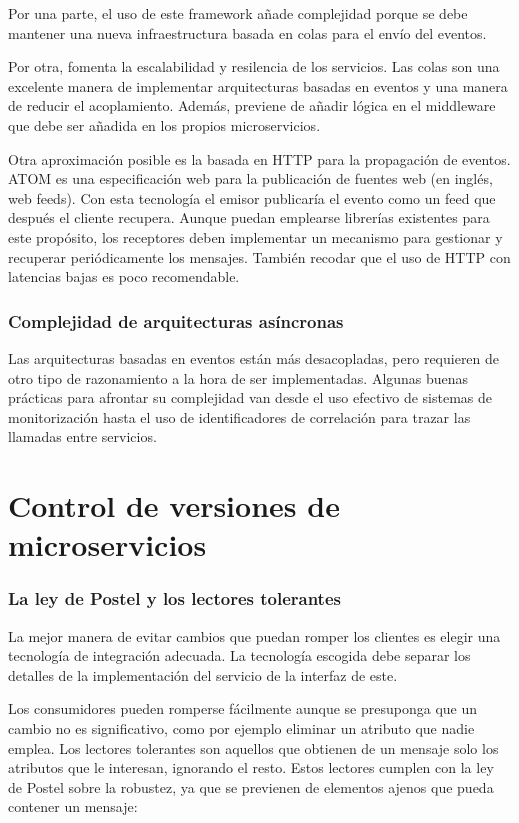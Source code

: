 \documentclass[11pt,a4paper]{article}
\begin{document}
Por una parte, el uso de este framework añade complejidad porque se debe mantener una nueva infraestructura basada en colas para el envío del eventos. 

Por otra, fomenta la escalabilidad y resilencia de los servicios. Las colas son una excelente manera de implementar arquitecturas basadas en eventos y una manera de reducir el acoplamiento. Además, previene de añadir lógica en el middleware que debe ser añadida en los propios microservicios.

Otra aproximación posible es la basada en HTTP para la propagación de eventos. ATOM es una especificación web para la publicación de fuentes web (en inglés, web feeds). Con esta tecnología el emisor publicaría el evento como un feed que después el cliente recupera. Aunque puedan emplearse librerías existentes para este propósito, los receptores deben implementar un mecanismo para gestionar y recuperar periódicamente los mensajes. También recodar que el uso de HTTP con latencias bajas es poco recomendable. 

\section{Complejidad de arquitecturas asíncronas}

Las arquitecturas basadas en eventos están más desacopladas, pero requieren de otro tipo de razonamiento a la hora de ser implementadas. Algunas buenas prácticas para afrontar su complejidad van desde el uso efectivo de sistemas de monitorización hasta el uso de identificadores de correlación para trazar las llamadas entre servicios.

\part{Control de versiones de microservicios}

\section{La ley de Postel y los lectores tolerantes}

La mejor manera de evitar cambios que puedan romper los clientes es elegir una tecnología de integración adecuada. La tecnología escogida debe separar los detalles de la implementación del servicio de la interfaz de este.

Los consumidores pueden romperse fácilmente aunque se presuponga que un cambio no es significativo, como por ejemplo eliminar un atributo que nadie emplea. Los lectores tolerantes son aquellos que obtienen de un mensaje solo los atributos que le interesan, ignorando el resto. Estos lectores cumplen con la ley de Postel sobre la robustez, ya que se previenen de elementos ajenos que pueda contener un mensaje:
\end{document}
